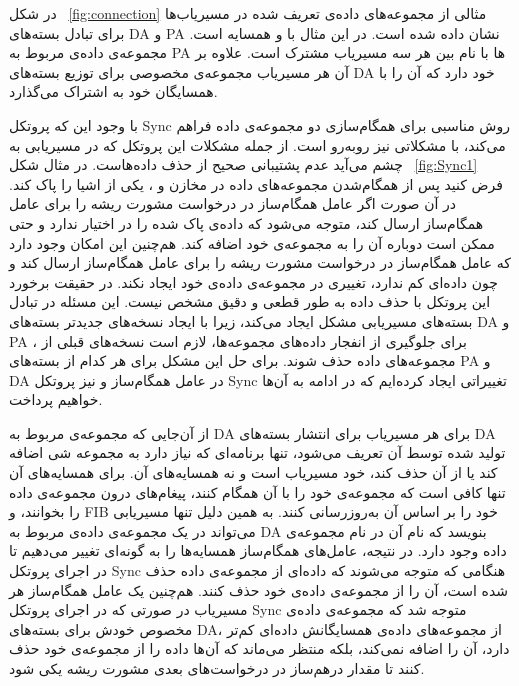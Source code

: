 در شکل ~\ref{fig:connection} مثالی از مجموعه‌های داده‌ی تعریف شده در مسیریاب‌ها برای تبادل بسته‌های DA و PA  نشان داده شده است. در این مثال  با  و  همسایه است. مجموعه‌ی داده‌ی مربوط به PA ها با نام  بین هر سه مسیریاب مشترک است. علاوه بر آن هر مسیریاب مجموعه‌ی مخصوصی برای توزیع بسته‌های DA خود دارد که آن را با همسایگان خود به اشتراک می‌گذارد.

با وجود این که پروتکل Sync روش مناسبی برای همگام‌سازی دو مجموعه‌ی داده فراهم می‌کند، با مشکلاتی نیز روبه‌رو است. از جمله مشکلات این پروتکل که در مسیریابی به چشم می‌آید عدم پشتیبانی صحیح از حذف داده‌هاست. در مثال شکل ~\ref{fig:Sync1} فرض کنید پس از همگام‌شدن مجموعه‌های داده در مخازن  و  ،  یکی از اشیا را پاک کند. در آن صورت اگر عامل همگام‌ساز در  درخواست مشورت ریشه را برای عامل همگام‌ساز  ارسال کند، متوجه می‌شود که داده‌ی پاک شده را در اختیار ندارد و حتی ممکن است دوباره آن را به مجموعه‌ی خود اضافه کند. هم‌چنین این امکان وجود دارد که عامل همگام‌ساز در  درخواست مشورت ریشه را برای عامل همگام‌ساز  ارسال کند و چون داده‌ای کم ندارد، تغییری در مجموعه‌ی داده‌ی خود ایجاد نکند. در حقیقت برخورد این پروتکل با حذف داده به طور قطعی و دقیق مشخص نیست. این مسئله در تبادل بسته‌های مسیریابی مشکل ایجاد می‌کند، زیرا با ایجاد نسخه‌های جدیدتر بسته‌های DA و PA ، برای جلوگیری از انفجار داده‌های مجموعه‌ها، لازم است نسخه‌های قبلی از مجموعه‌های داده حذف شوند. برای حل این مشکل برای هر کدام از بسته‌های PA و DA در عامل همگام‌ساز و نیز پروتکل Sync تغییراتی ایجاد کرده‌ایم که در ادامه به آن‌ها خواهیم پرداخت.

از آن‌جایی که مجموعه‌ی مربوط به DA برای هر مسیریاب برای انتشار بسته‌های DA تولید شده توسط آن تعریف می‌شود، تنها برنامه‌ای که نیاز دارد به مجموعه شی اضافه کند یا از آن حذف کند، خود مسیریاب است و نه همسایه‌های آن. برای همسایه‌های آن تنها کافی است که مجموعه‌ی خود را با آن همگام کنند، پیغام‌های درون مجموعه‌ی داده را بخوانند، و FIB خود را بر اساس آن به‌روزرسانی کنند. به همین دلیل تنها مسیریابی می‌تواند در یک مجموعه‌ی داده‌ی مربوط به DA بنویسد که نام آن در نام مجموعه‌ی داده وجود دارد. در نتیجه، عامل‌های همگام‌ساز همسایه‌ها را به گونه‌ای تغییر می‌دهیم تا در اجرای پروتکل Sync هنگامی که متوجه می‌شوند که داده‌ای از مجموعه‌ی داده حذف شده است، آن را از مجموعه‌ی داده‌ی خود حذف کنند. هم‌چنین یک عامل همگام‌ساز هر مسیریاب در صورتی که در اجرای پروتکل Sync متوجه شد که مجموعه‌ی داده‌ی مخصوص خودش برای بسته‌های DA، از مجموعه‌های داده‌ی همسایگانش داده‌ای کم‌تر دارد، آن را اضافه نمی‌کند، بلکه منتظر می‌ماند که آن‌ها داده را از مجموعه‌ی خود حذف کنند تا مقدار درهم‌ساز در درخواست‌های بعدی مشورت ریشه یکی شود. 

